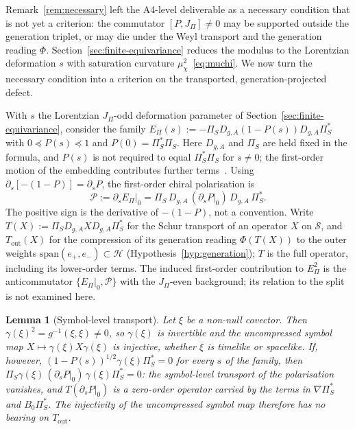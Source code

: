 \documentclass[11pt]{article}
\newtheorem{lemma}{Lemma}
\theoremstyle{definition}
\newcommand{\EPi}{E_\Pi}
\newcommand{\PiS}{\Pi_S}
\begin{document}
    Remark~\ref{rem:necessary} left the A4-level deliverable as a necessary condition that is not yet a
    criterion: the commutator $[P,J_\Pi]\neq0$ may be supported outside the generation triplet, or may die
    under the Weyl transport and the generation reading $\Phi$.
    Section~\ref{sec:finite-equivariance} reduces the modulus to the Lorentzian deformation $s$
    with saturation curvature $\mu_\chi^2$~\eqref{eq:muchi}.
    We now turn the necessary condition into a criterion on the transported,
    generation-projected defect.

    With $s$ the Lorentzian $J_\Pi$-odd deformation parameter of Section~\ref{sec:finite-equivariance}, consider the
    family $\EPi(s):=-\PiS D_{g,A}(1-P(s))D_{g,A}\PiS^{*}$ with $0\preceq P(s)\preceq1$ and $P(0)=\PiS^{*}\PiS$.
    Here $D_{g,A}$ and $\PiS$ are held fixed in the formula, and $P(s)$ is not required to equal $\PiS^{*}\PiS$ for
    $s\neq0$; the first-order motion of the embedding contributes further terms~\cite{Beau2026ebj}.
    Using $\partial_s[-(1-P)]=\partial_sP$, the first-order chiral polarisation is
    \begin{equation}
      \label{eq:polarisation}
      \mathcal P:=\partial_s\EPi\big|_0=\PiS\,D_{g,A}\,(\partial_sP|_0)\,D_{g,A}\,\PiS^{*}.
    \end{equation}
    The positive sign is the derivative of $-(1-P)$, not a convention.
    Write $T(X):=\PiS D_{g,A}XD_{g,A}\PiS^{*}$ for the Schur transport of an operator $X$ on $\mathcal S$, and
    $T_{\mathrm{out}}(X)$ for the compression of its generation reading $\Phi(T(X))$ to the outer weights
    $\mathrm{span}(e_+,e_-)\subset\mathcal H$ (Hypothesis~\ref{hyp:generation});
    $T$ is the full operator, including its lower-order terms.
    The induced first-order contribution to $\EPi^2$ is the anticommutator $\{\EPi|_0,\mathcal P\}$ with the
    $J_\Pi$-even background; its relation to the split is not examined here.

    \begin{lemma}[Symbol-level transport]
      \label{lem:weyl-faithful}
      Let $\xi$ be a non-null covector.
      Then $\gamma(\xi)^2=g^{-1}(\xi,\xi)\neq0$, so $\gamma(\xi)$ is invertible and the uncompressed symbol map
      $X\mapsto\gamma(\xi)X\gamma(\xi)$ is injective, whether $\xi$ is timelike or spacelike.
      If, however, $(1-P(s))^{1/2}\gamma(\xi)\PiS^{*}=0$ for every $s$ of the family, then
      $\PiS\gamma(\xi)\,(\partial_sP|_0)\,\gamma(\xi)\PiS^{*}=0$: the symbol-level transport of the polarisation
      vanishes, and $T(\partial_sP|_0)$ is a zero-order operator carried by the terms in $\nabla\PiS^{*}$ and
      $B_0\PiS^{*}$.
      The injectivity of the uncompressed symbol map therefore has no bearing on $T_{\mathrm{out}}$.
    \end{lemma}
\end{document}
